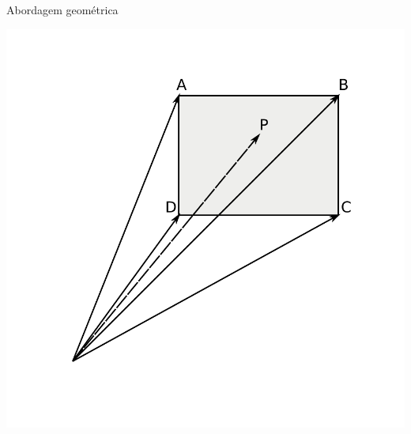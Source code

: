 \documentclass{beamer}
\begin{document}
\begin{frame}{Abordagem geométrica}
	\begin{center}
	\includegraphics[keepaspectratio, width=1.0\textwidth, height=0.8\textheight, clip, trim=0.75in 0.75in 0.70in 0.50in]{../monografia/img/geometria_ABCD1.pdf}
	\end{center}
\end{frame}
\end{document}
